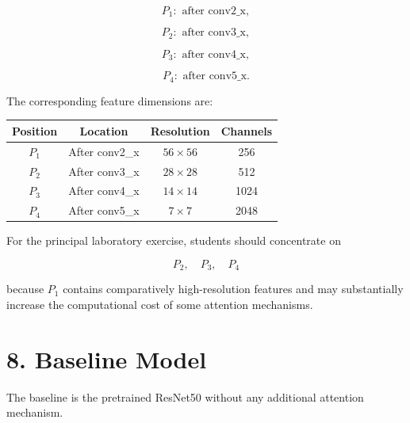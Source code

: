 \documentclass[10pt]{article}
\begin{document}
\[
P_1:
\text{ after conv2\_x},
\]

\[
P_2:
\text{ after conv3\_x},
\]

\[
P_3:
\text{ after conv4\_x},
\]

\[
P_4:
\text{ after conv5\_x}.
\]

The corresponding feature dimensions are:

\begin{center}

\begin{tabular}{|c|c|c|c|}
\hline

\textbf{Position}
&
\textbf{Location}
&
\textbf{Resolution}
&
\textbf{Channels}
\\
\hline

$P_1$
&
After conv2\_x
&
$56\times56$
&
256
\\
\hline

$P_2$
&
After conv3\_x
&
$28\times28$
&
512
\\
\hline

$P_3$
&
After conv4\_x
&
$14\times14$
&
1024
\\
\hline

$P_4$
&
After conv5\_x
&
$7\times7$
&
2048
\\
\hline

\end{tabular}

\end{center}

For the principal laboratory exercise, students should concentrate on

\[
\boxed{
P_2,\quad P_3,\quad P_4
}
\]

because $P_1$ contains comparatively high-resolution features and may
substantially increase the computational cost of some attention mechanisms.

\section*{8. Baseline Model}

The baseline is the pretrained ResNet50 without any additional attention
mechanism.
\end{document}
